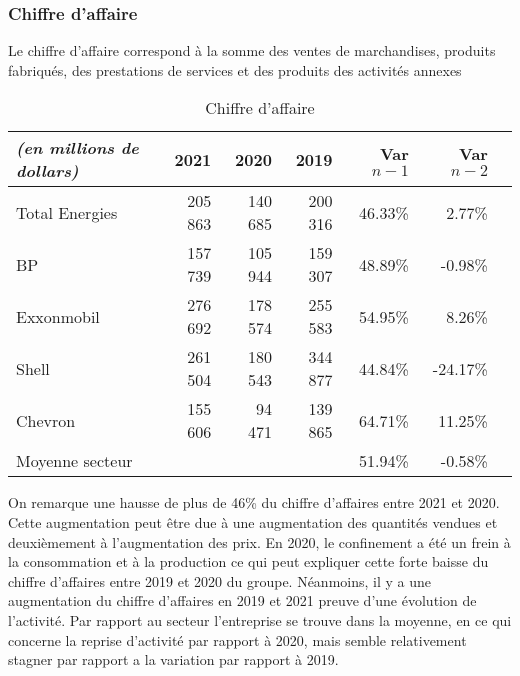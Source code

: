 \documentclass[12pt]{article}
\begin{document}
\subsubsection{Chiffre d'affaire}
Le chiffre d'affaire correspond à la somme des ventes de marchandises, produits fabriqués, des prestations de services et des produits des activités annexes
\begin{table}[H]
    \sffamily
    \centering
    \caption{Chiffre d'affaire}
    \label{table:CA}
    \begin{tabular}{l*{1}{rrrrrr}}
        \toprule
        \textit{(en millions de dollars)} & \textbf{2021} & 2020 & 2019 & Var $n-1$ & Var $n-2$ \\
        \midrule
        Total Energies & 205 863 & 140 685 & 200 316 & 46.33\% & 2.77\% \\
        \midrule
        BP & 157 739 & 105 944 & 159 307 & 48.89\% & -0.98\% \\
        Exxonmobil & 276 692 & 178 574 & 255 583 & 54.95\% & 8.26\% \\ 
        Shell & 261 504 & 180 543 & 344 877 & 44.84\% & -24.17\% \\
        Chevron & 155 606 & 94 471 & 139 865 & 64.71\% & 11.25\% \\ 
    \midrule
        Moyenne secteur & ~ & ~ & ~ & 51.94\% & -0.58\% \\
    \bottomrule
    \end{tabular}
\end{table}
On remarque une hausse de plus de 46\% du chiffre d'affaires entre 2021 et 2020. Cette augmentation peut être due à une augmentation des quantités vendues et deuxièmement à l'augmentation des prix. En 2020, le confinement a été un frein à la consommation et à la production ce qui peut expliquer cette forte baisse du chiffre d'affaires entre 2019 et 2020 du groupe. Néanmoins, il y a une augmentation du chiffre d'affaires en 2019 et 2021 preuve d'une évolution de l'activité.
Par rapport au secteur l'entreprise se trouve dans la moyenne, en ce qui concerne la reprise d'activité par rapport à 2020, mais semble relativement stagner par rapport a la variation par rapport à 2019.
\end{document}
